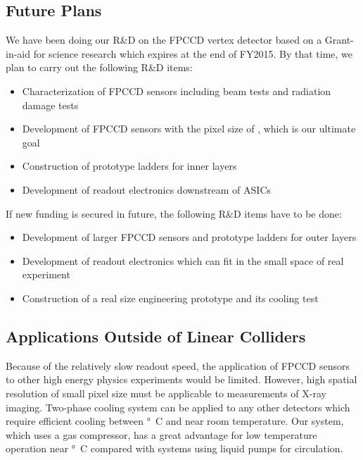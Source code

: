\subsection{Future Plans}
    We have been doing our R\&D on the FPCCD vertex detector based on a Grant-in-aid for science research which expires at the end of FY2015. By that time, we plan to carry out the following R\&D items:
\begin{itemize}
    \item Characterization of FPCCD sensors including beam tests and radiation damage tests
    \item Development of FPCCD sensors with the pixel size of \unit[5]{\micron}, which is our ultimate goal
    \item Construction of prototype ladders for inner layers
    \item Development of readout electronics downstream of ASICs
\end{itemize}
If new funding is secured in future, the following R\&D items have to be done:
\begin{itemize}
    \item Development of larger FPCCD sensors and prototype ladders for outer layers
    \item Development of readout electronics which can fit in the small space of real experiment
    \item Construction of a real size engineering prototype and its cooling test
\end{itemize}

\subsection{Applications Outside of Linear Colliders}
    Because of the relatively slow readout speed, the application of FPCCD sensors to other high energy physics experiments would be limited. However, high spatial resolution of small pixel size must be applicable to measurements of X-ray imaging.
    Two-phase  cooling system can be applied to any other detectors which require efficient cooling between \unit[-40]{\degree C} and near room temperature. Our system, which uses a  gas compressor, has a great advantage for low temperature operation near \unit[-40]{\degree C} compared with systems using liquid pumps for circulation.

